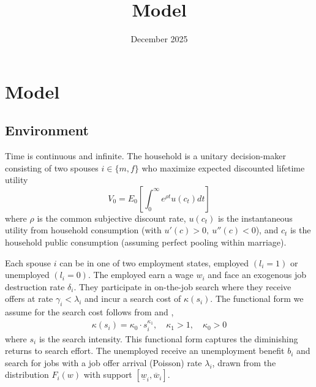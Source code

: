 \documentclass{article}
\title{Model}
\date{December 2025}
\begin{document}
\section{Model}

\subsection*{Environment}
Time is continuous and infinite. The household is a unitary decision-maker consisting of two spouses $i\in\{m,f\}$ who maximize expected discounted lifetime utility \begin{equation*}
    V_0=E_0\left[\int_0^\infty e^{\rho t}u(c_t)dt\right]
\end{equation*} where $\rho$ is the common subjective discount rate, $u(c_t)$ is the instantaneous utility from household consumption (with $u'(c)>0,\ u''(c)<0$), and $c_t$ is the household public consumption (assuming perfect pooling within marriage). 

Each spouse $i$ can be in one of two employment states, employed $(l_i=1)$ or unemployed $(l_i=0)$. The employed earn a wage $w_i$ and face an exogenous job destruction rate $\delta_i$. They participate in on-the-job search where they receive offers at rate $\gamma_i<\lambda_i$ and incur a search cost of $\kappa(s_i)$. The functional form we assume for the search cost follows from \cite{10.1093/restud/rds042} and \cite{WANG2019165}, \begin{align*}
    \kappa(s_i)=\kappa_0\cdot s_i^{\kappa_1},\quad \kappa_1>1, \quad \kappa_0 >0
\end{align*} where $s_i$ is the search intensity. This functional form captures the diminishing returns to search effort. The unemployed receive an unemployment benefit $b_i$ and search for jobs with a job offer arrival (Poisson) rate $\lambda_i$, drawn from the distribution $F_i(w)$ with support $[\underline{w}_i,\overline{w}_i]$. 
\end{document}
